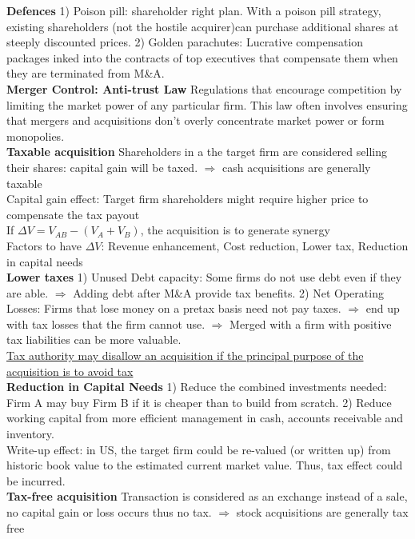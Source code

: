 \documentclass[12pt,landscape, a4paper]{article}
\theoremstyle{remark}
\begin{document}
\begin{multicols*}{3}
\textbf{Defences} 1) Poison pill: shareholder right plan. With a poison pill strategy, existing shareholders (not the hostile acquirer)can purchase additional shares at steeply discounted prices. 2) Golden parachutes: Lucrative compensation packages inked into the contracts of top executives that compensate them when they are terminated from M\&A.\\

\textbf{Merger Control: Anti-trust Law} Regulations that encourage competition by limiting the market power of any particular firm. This law often involves ensuring that mergers and acquisitions don’t overly concentrate market power or form monopolies.\\

\textbf{Taxable acquisition} Shareholders in a the target firm are considered selling their shares: capital gain will be taxed. $\Rightarrow$ cash acquisitions are generally taxable\\
Capital gain effect: Target firm shareholders might require higher price to compensate the tax payout\\
If $\Delta V = V_{AB} - (V_A + V_B)$, the acquisition is to generate synergy\\
Factors to have $\Delta V$: Revenue enhancement, Cost reduction, Lower tax, Reduction in capital needs\\
\textbf{Lower taxes} 1) Unused Debt capacity: Some firms do not use debt even if they are able. $\Rightarrow$ Adding debt after M\&A provide tax benefits. 2) Net Operating Losses: Firms that lose money on a pretax basis need not pay taxes. $\Rightarrow$ end up with tax losses that the firm cannot use. $\Rightarrow$ Merged with a firm with positive tax liabilities can be more valuable.\\
\underline{Tax authority may disallow an acquisition if the principal purpose of the acquisition is to avoid tax}\\ 

\textbf{Reduction in Capital Needs} 1) Reduce the combined investments needed: Firm A may buy Firm B if it is cheaper than to build from scratch. 2) Reduce working capital from more efficient management in cash, accounts receivable and inventory.\\

Write-up effect: in US, the target firm could be re-valued (or written up) from historic book value to the estimated current market value. Thus, tax effect could be incurred.\\

\textbf{Tax-free acquisition} Transaction is considered as an exchange instead of a sale, no capital gain or loss occurs thus no tax. $\Rightarrow$ stock acquisitions are generally tax free




























\end{multicols*}
\end{document}
